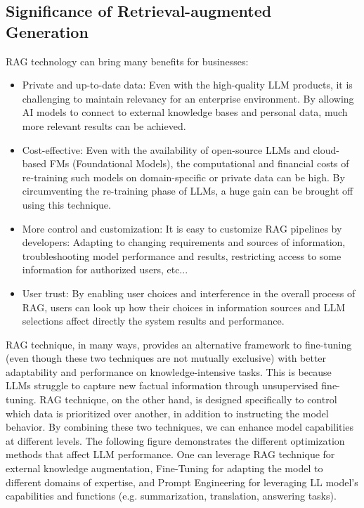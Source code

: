 \subsection{Significance of Retrieval-augmented Generation}
RAG technology can bring many benefits for businesses:
\begin{itemize}
    \item Private and up-to-date data: Even with the high-quality LLM products, it is challenging to maintain relevancy for an enterprise environment. By allowing AI models to connect to external knowledge bases and personal data, much more relevant results can be achieved.
    \item Cost-effective: Even with the availability of open-source LLMs and cloud-based FMs (Foundational Models), the computational and financial costs of re-training such models on domain-specific or private data can be high. By circumventing the re-training phase of LLMs, a huge gain can be brought off using this technique.
    \item More control and customization: It is easy to customize RAG pipelines by developers: Adapting to changing requirements and sources of information, troubleshooting model performance and results, restricting access to some information for authorized users, etc...
    \item User trust: By enabling user choices and interference in the overall process of RAG, users can look up how their choices in information sources and LLM selections affect directly the system results and performance.
\end{itemize}
RAG technique, in many ways, provides an alternative framework to fine-tuning (even though these two techniques are not mutually exclusive) with better adaptability and performance on knowledge-intensive tasks. This is because LLMs struggle to capture new factual information through unsupervised fine-tuning. RAG technique, on the other hand, is designed specifically to control which data is prioritized over another, in addition to instructing the model behavior. By combining these two techniques, we can enhance model capabilities at different levels.\newline
The following figure demonstrates the different optimization methods that affect LLM performance. One can leverage RAG technique for external knowledge augmentation, Fine-Tuning for adapting the model to different domains of expertise, and Prompt Engineering for leveraging LL model's capabilities and functions (e.g. summarization, translation, answering tasks).\newpage
